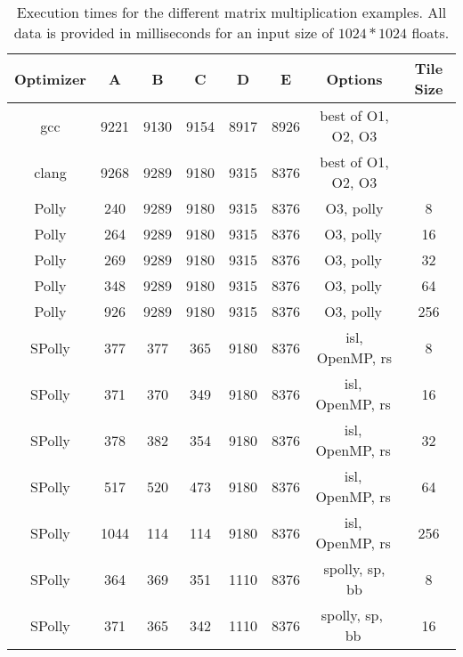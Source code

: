 \begin{table}[h]
  \begin{framed}
    \centering
    \caption[Execution times for the different matrix multiplication cases]{Execution times for the different matrix multiplication examples. 
  All data is provided in milliseconds for an input size of $1024 * 1024$ floats.}
  \label{tab:CaseStudyResults}
  \begin{tabular}{ c |  c | c | c | c | c | c | c}
    Optimizer & A & B & C &  D & E & Options & Tile Size\\
    \hline
    \hline
    gcc     & 9221 & 9130  & 9154 &  8917 & 8926 &  best of O1, O2, O3 &  \\ 
    clang   & 9268 & 9289  & 9180 &  9315 & 8376 &  best of O1, O2, O3& \\ 
    \hline
    Polly   & 240 & 9289  & 9180 & 9315 & 8376 & 
    O3, polly\footnotemark[1] & 8\\  
    Polly  & 264 & 9289 & 9180 & 9315 &  8376 &  
    O3, polly\;\, & 16\\  
    Polly   & 269 & 9289 & 9180 & 9315 &  8376 &
    O3, polly\;\, & 32\\  
    Polly   & 348 & 9289 & 9180 & 9315 & 8376  &
    O3, polly\;\, & 64\\  
    Polly   & 926 & 9289 &  9180& 9315 & 8376  &
    O3, polly\;\, & 256 \\  
    SPolly  & 377 & 377 & 365  & 9180 & 8376 & isl\footnotemark[2], OpenMP, rs\footnotemark[3] & 8\\  
    SPolly  & 371 & 370 & 349  & 9180 & 8376 & isl,\,\: OpenMP, rs\;\,  & 16\\  
    SPolly  & 378 & 382 & 354  & 9180 & 8376 & isl,\,\: OpenMP, rs\;\, & 32\\  
    SPolly  & 517 & 520 & 473  & 9180 & 8376 & isl,\,\: OpenMP, rs\;\,   & 64\\  
    SPolly  & 1044 & 114 & 114 & 9180 & 8376 & isl,\,\: OpenMP, rs\;\,  & 256\\  
    SPolly  & 364 & 369 & 351  & 1110 & 8376 & spolly, sp\footnotemark[4], bb\footnotemark[5] & 8\\  
    SPolly  & 371 & 365 & 342  & 1110 & 8376 & spolly, sp,\,\, bb\;\, & 16\\  

\end{tabular}
\end{framed}
\end{table}
